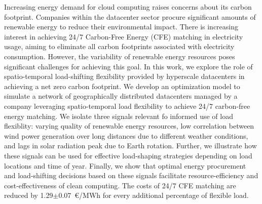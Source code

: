%

Increasing energy demand for cloud computing raises concerns about its carbon footprint. Companies within the datacenter sector procure significant amounts of renewable energy to reduce their environmental impact. There is increasing interest in achieving 24/7 Carbon-Free Energy (CFE) matching in electricity usage, aiming to eliminate all carbon footprints associated with electricity consumption. However, the variability of renewable energy resources poses significant challenges for achieving this goal. In this work, we explore the role of spatio-temporal load-shifting flexibility provided by hyperscale datacenters in achieving a net zero carbon footprint. We develop an optimization model to simulate a network of geographically distributed datacenters managed by a company leveraging spatio-temporal load flexibility to achieve 24/7 carbon-free energy matching. We isolate three signals relevant fo informed use of load flexiblity: varying quality of renewable energy resources, low correlation between wind power generation over long distances due to different weather conditions, and lags in solar radiation peak due to Earth rotation. Further, we illustrate how these signals can be used for effective load-shaping strategies depending on load locations and time of year. Finally, we show that optimal energy procurement and load-shifting decisions based on these signals facilitate resource-efficiency and cost-effectiveness of clean computing. The costs of 24/7 CFE matching are reduced by 1.29$\pm$0.07~\euro/MWh for every additional percentage of flexible load.